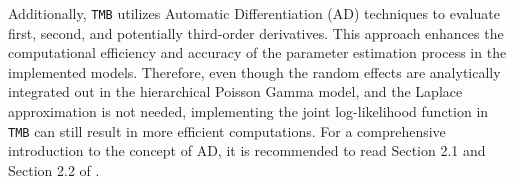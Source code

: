 \documentclass[preprint, 3p, authoryear]{elsarticle} %
\begin{document}
Additionally, \texttt{TMB} utilizes Automatic Differentiation (AD) techniques \citep{Griewank_2008} to evaluate first, second, and potentially third-order derivatives. This approach enhances the computational efficiency and accuracy of the parameter estimation process in the implemented models. Therefore, even though the random effects are analytically integrated out in the hierarchical Poisson Gamma model, and the Laplace approximation is not needed, implementing the joint log-likelihood function in \texttt{TMB} can still result in more efficient computations. For a comprehensive introduction to the concept of AD, it is recommended to read Section 2.1 and Section 2.2 of \citet{Fournier_2012}.

\newpage

\renewcommand\refname{References}

\end{document}
